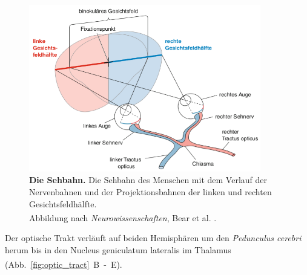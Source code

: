 \begin{figure}[H]
    \centering
    \includegraphics[width = 0.9\textwidth]{pictures/visual/Sehbahn.png}
    \caption[Die Sehbahn]{\textbf{Die Sehbahn.} Die Sehbahn des Menschen mit dem Verlauf der Nervenbahnen und der Projektionsbahnen der linken und rechten Gesichtsfeldhälfte.\\
    Abbildung nach \textit{Neurowissenschaften}, Bear et al. \textsuperscript{\cite[Kap.~10]{neurowissenschaften_baer}}.}
    \label{fig:sehbahn_baer}
\end{figure}

Der optische Trakt verläuft auf beiden Hemisphären um den \textit{Pedunculus cerebri} herum bis in den Nucleus geniculatum lateralis im Thalamus (Abb.~\ref{fig:optic_tract}~B~-~E). \textsuperscript{\cite[Kap.~15]{crossman2014neuroanatomy}}


